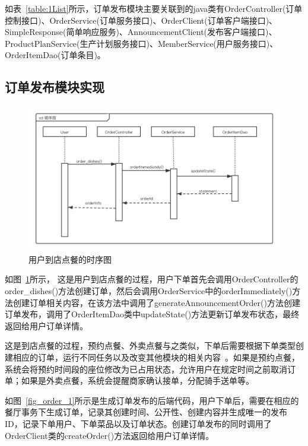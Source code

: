 如表~\ref{table:1List}所示，订单发布模块主要关联到的java类有OrderController(订单控制接口)、OrderService(订单服务接口)、OrderClient(订单客户端接口)、SimpleResponse(简单响应服务)、AnnouncementClient(发布客户端接口)、ProductPlanService(生产计划服务接口)、MemberService(用户服务接口)、OrderItemDao(订单条目)。\\

\subsection{订单发布模块实现}

\begin{figure}[htbp!]
    \centering
    \includegraphics[width=5in]{FIGs/chapter4/order_time.pdf}
    \caption{用户到店点餐的时序图}\label{fig_order_time}
\end{figure}

如图~\ref{fig_order_time}所示，
这是用户到店点餐的过程，用户下单首先会调用OrderController的order\_dishes()方法创建订单，然后会调用OrderService中的orderImmediately()方法创建订单相关内容，在该方法中调用了generateAnnouncementOrder()方法创建订单发布，调用了OrderItemDao类中updateState()方法更新订单发布状态，最终返回给用户订单详情。

这是到店点餐的过程，预约点餐、外卖点餐与之类似，下单后需要根据下单类型创建相应的订单，运行不同任务以及改变其他模块的相关内容~\cite{jq2016}。如果是预约点餐，系统会将预约时间段的座位修改为已占用状态，允许用户在规定时间之前取消订单；如果是外卖点餐，系统会提醒商家确认接单，分配骑手送单等。

如图~\ref{fig_order_1}所示是生成订单发布的后端代码，用户下单后，需要在相应的餐厅事务下生成订单，记录其创建时间、公开性、创建内容并生成唯一的发布ID，记录下单用户、下单菜品以及订单状态。创建订单发布的同时调用了OrderClient类的createOrder()方法返回给用户订单详情。

